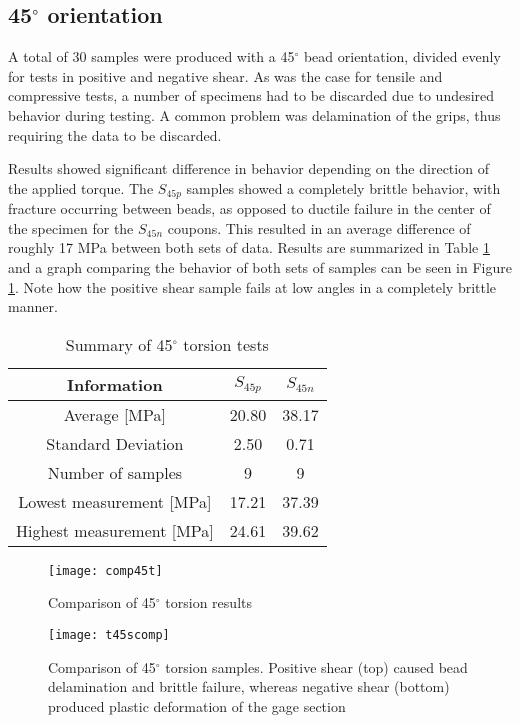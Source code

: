 \documentclass[main.tex]{subfiles}
\begin{document}
\subsection{45$^\circ$ orientation} \label{ssec:45r}
A total of 30 samples were produced with a 45$^\circ$ bead orientation, divided evenly for tests in positive and negative shear. As was the case for tensile and compressive tests, a number of specimens had to be discarded due to undesired behavior during testing. A common problem was delamination of the grips, thus requiring the data to be discarded. 

Results showed significant difference in behavior depending on the direction of the applied torque. The $S_{45p}$ samples showed a completely brittle behavior, with fracture occurring between beads, as opposed to ductile failure in the center of the specimen for the $S_{45n}$ coupons. This resulted in an average difference of roughly 17 MPa between both sets of data. Results are summarized in Table \ref{tab:tors45r} and a graph comparing the behavior of both sets of samples can be seen in Figure \ref{fig:45comp}. Note how the positive shear sample fails at low angles in a completely brittle manner.

\begin{table} [h]
	\centering
	\caption{Summary of 45$^\circ$ torsion tests}
\begin{tabular}{ c| c c } 
	\toprule
	\textbf{Information} & $S_{45p}$ & $S_{45n}$\\
	\midrule
	Average [MPa] & 20.80 & 38.17\\
	Standard Deviation & 2.50 & 0.71\\
	Number of samples & 9 & 9\\
	Lowest measurement [MPa] &17.21  & 37.39\\
	Highest measurement [MPa] &24.61 & 39.62\\
	\bottomrule
\end{tabular}
\label{tab:tors45r}
\end{table}

\begin{figure}[!htbp]
	\center
	\texttt{[image: comp45t]}
	\caption{Comparison of 45$^\circ$ torsion results} \label{fig:45comp}
\end{figure}

\begin{figure}[!htbp]
	\center
	\texttt{[image: t45scomp]}
	\captionsetup{justification=centering} %
	\caption[Comparison of 45$^\circ$ torsion results]{Comparison of 45$^\circ$ torsion samples. Positive shear (top) caused bead delamination and brittle failure, whereas negative shear (bottom) produced plastic deformation of the gage section} \label{fig:45scomp}
\end{figure}
  
\end{document}
